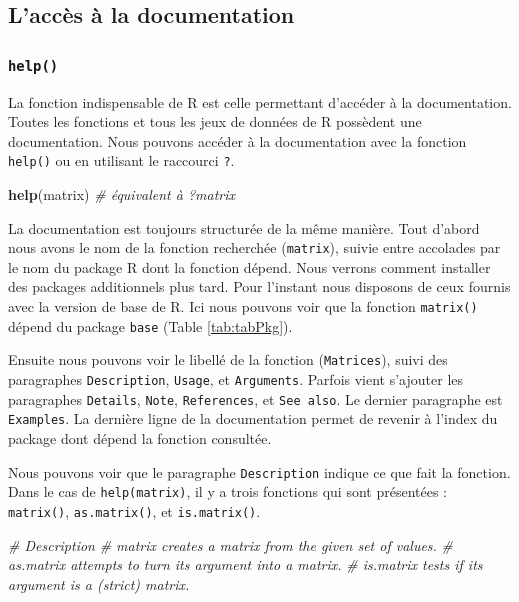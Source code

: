 \documentclass[
]{book}
\newenvironment{Shaded}{\begin{snugshade}}{\end{snugshade}}
\newcommand{\CommentTok}[1]{\textcolor[rgb]{0.56,0.35,0.01}{\textit{#1}}}
\newcommand{\KeywordTok}[1]{\textcolor[rgb]{0.13,0.29,0.53}{\textbf{#1}}}
\newcommand{\NormalTok}[1]{#1}
\begin{document}
\hypertarget{laccuxe8s-uxe0-la-documentation}{%
\subsection{L'accès à la documentation}\label{laccuxe8s-uxe0-la-documentation}}

\hypertarget{l015help}{%
\subsubsection{\texorpdfstring{\texttt{help()}}{help()}}\label{l015help}}

La fonction indispensable de R est celle permettant d'accéder à la documentation. Toutes les fonctions et tous les jeux de données de R possèdent une documentation. Nous pouvons accéder à la documentation avec la fonction \texttt{help()} ou en utilisant le raccourci \texttt{?}.

\begin{Shaded}
\begin{Highlighting}[]
\KeywordTok{help}\NormalTok{(matrix) }\CommentTok{# équivalent à ?matrix}
\end{Highlighting}
\end{Shaded}

La documentation est toujours structurée de la même manière. Tout d'abord nous avons le nom de la fonction recherchée (\texttt{matrix}), suivie entre accolades par le nom du package R dont la fonction dépend. Nous verrons comment installer des packages additionnels plus tard. Pour l'instant nous disposons de ceux fournis avec la version de base de R. Ici nous pouvons voir que la fonction \texttt{matrix()} dépend du package \texttt{base} (Table \ref{tab:tabPkg}).

Ensuite nous pouvons voir le libellé de la fonction (\texttt{Matrices}), suivi des paragraphes \texttt{Description}, \texttt{Usage}, et \texttt{Arguments}. Parfois vient s'ajouter les paragraphes \texttt{Details}, \texttt{Note}, \texttt{References}, et \texttt{See\ also}. Le dernier paragraphe est \texttt{Examples}. La dernière ligne de la documentation permet de revenir à l'index du package dont dépend la fonction consultée.

Nous pouvons voir que le paragraphe \texttt{Description} indique ce que fait la fonction. Dans le cas de \texttt{help(matrix)}, il y a trois fonctions qui sont présentées : \texttt{matrix()}, \texttt{as.matrix()}, et \texttt{is.matrix()}.

\begin{Shaded}
\begin{Highlighting}[]
\CommentTok{# Description}
\CommentTok{# matrix creates a matrix from the given set of values.}
\CommentTok{# as.matrix attempts to turn its argument into a matrix.}
\CommentTok{# is.matrix tests if its argument is a (strict) matrix.}
\end{Highlighting}
\end{Shaded}
\end{document}
